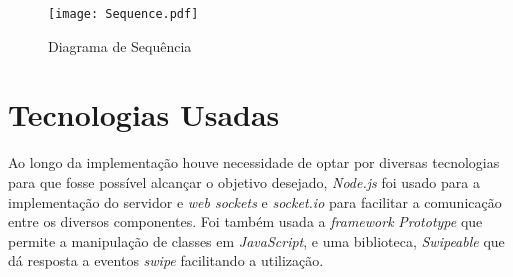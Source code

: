 \begin{figure}[ht]
\centering
\texttt{[image: Sequence.pdf]}
\caption[Diagrama de Sequência] {Diagrama de Sequência}
\label{fig:sequencia}
\end{figure}


\section{Tecnologias Usadas} \label{sec:tec}

Ao longo da implementação houve necessidade de optar por diversas tecnologias para que fosse possível alcançar o objetivo desejado, \textit{Node.js} foi usado para a implementação do servidor e \textit{web sockets} e \textit{socket.io} para facilitar a comunicação entre os diversos componentes. Foi também usada a \textit{framework} \textit{Prototype} que permite a manipulação de classes em \textit{JavaScript}, e uma biblioteca, \textit{Swipeable} que dá resposta a eventos \textit{swipe} facilitando a utilização.

